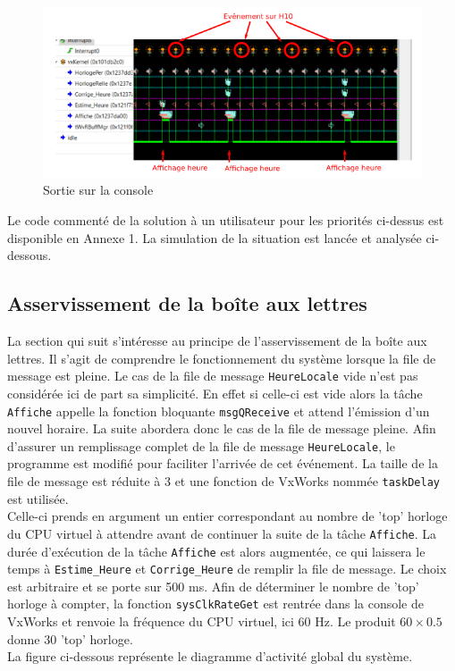 \documentclass[french]{article}
\begin{document}
	
	
	\begin{figure}[H]
		\centering
		\includegraphics[width=16cm]{photo/affichage_normal/interruption_corrige_heure}
		\caption{Sortie sur la console}
		\label{fig:affichage_comportement_normal}
	\end{figure}
	
	Le code commenté de la solution à un utilisateur pour les priorités ci-dessus est disponible en Annexe 1. La simulation de la situation est lancée et analysée ci-dessous.


	\subsection{Asservissement de la boîte aux lettres}	
	
	La section qui suit s'intéresse au principe de l'asservissement de la boîte aux lettres. Il s'agit de comprendre le fonctionnement du système lorsque la file de message est pleine. Le cas de la file de message \texttt{HeureLocale} vide n'est pas considérée ici de part sa simplicité. En effet si celle-ci est vide alors la tâche \texttt{Affiche} appelle la fonction bloquante \texttt{msgQReceive} et attend l'émission d'un nouvel horaire. La suite abordera donc le cas de la file de message pleine. Afin d'assurer un remplissage complet de la file de message \texttt{HeureLocale}, le programme est modifié pour faciliter l'arrivée de cet événement. La taille de la file de message est réduite à 3 et une fonction de VxWorks nommée \texttt{taskDelay} est utilisée.\\
	Celle-ci prends en argument un entier correspondant au nombre de 'top' horloge du CPU virtuel à attendre avant de continuer la suite de la tâche \texttt{Affiche}. La durée d'exécution de la tâche \texttt{Affiche} est alors augmentée, ce qui laissera le temps à \texttt{Estime\_Heure} et \texttt{Corrige\_Heure} de remplir la file de message. Le choix est arbitraire et se porte sur 500 ms. Afin de déterminer le nombre de 'top' horloge à compter, la fonction \texttt{sysClkRateGet} est rentrée dans la console de VxWorks et renvoie la fréquence du CPU virtuel, ici 60 Hz. Le produit $60\times0.5$ donne 30 'top' horloge.\\
	La figure ci-dessous représente le diagramme d'activité global du système.
	
\end{document}
